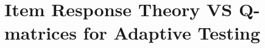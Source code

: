 \documentclass{sig-alternate}
\begin{document}
%

\title{Item Response Theory VS Q-matrices for Adaptive Testing}
%
%
%
%
%
\end{document}
